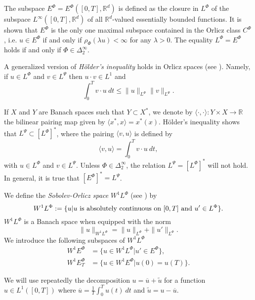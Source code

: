 \documentclass[twoside]{article}
\theoremstyle{remark}
\newcommand{\orlnor}{\|_{L^{\Phi}}}
\newcommand{\lphi}{L^{\Phi}}
\newcommand{\lpsi}{L^{\Psi}}
\newcommand{\ephi}{E^{\Phi}}
\newcommand{\claseor}{C^{\Phi}}
\newcommand{\wphi}{W^{1}\lphi}
\newcommand{\wphie}{W^{1}\ephi}
\newcommand{\rr}{\mathbb{R}}
\renewcommand{\leq}{\leqslant}
\begin{document}
The subspace $\ephi=\ephi([0,T],\rr^d)$ is defined as the closure in $\lphi$ of the subspace $L^{\infty}([0,T],\rr^d)$ of all $\mathbb{R}^d$-valued essentially bounded functions. It is shown that  $\ephi$ is the only one maximal subspace contained in the Orlicz class $\claseor$, i.e.
$u\in\ephi$ if and only if $\rho_{\Phi}(\lambda u)<\infty$ for any $\lambda>0$. The equality $\lphi=\ephi$ holds if and only if $\Phi\in\Delta_2^{\infty}$.

A generalized version of \emph{H\"older's inequality} holds in Orlicz spaces (see \cite[Thm. 9.3]{KR}). Namely, if $u\in\lphi$ and $v\in\lpsi$ then $u\cdot v\in L^1$ and
\begin{equation}\label{holder}
\int_0^Tv\cdot u\ dt\leq \|u\orlnor\|v\|_{L^{\Psi}}.
\end{equation}




If $X$ and $Y$ are  Banach spaces such that  $Y\subset X^*$, we denote by $\langle\cdot,\cdot\rangle:Y\times X\to\mathbb{R}$ the bilinear pairing  map given by $\langle x^*,x\rangle=x^*(x)$. H\"older's inequality shows that $\lpsi\subset \left[\lphi\right]^*$, where the pairing
$\langle v, u\rangle$
is defined by 
\begin{equation}\label{pairing}
  \langle v,u\rangle=\int_0^Tv\cdot u\ dt,
\end{equation}
with  $u\in\lphi$ and $v\in\lpsi$.
 Unless $\Phi \in \Delta_2^{\infty}$, the relation $\lpsi= \left[\lphi\right]^*$ will not hold. In general, it is true  that  $\left[\ephi\right]^*=\lpsi$.



We define the \emph{Sobolev-Orlicz space} $\wphi$ (see \cite{adams_sobolev}) by
\[\wphi:=\{u| u \hbox{ is absolutely continuous on $[0,T]$ and } u'\in \lphi\}.\]
$\wphi$ is a Banach space when equipped with the norm
\begin{equation}\label{def-norma-orlicz-sob}
\|  u  \|_{\wphi}= \|  u  \|_{\lphi} + \|u'\orlnor.
\end{equation}
We introduce the following subspaces of $\wphi$
\begin{equation}\label{def-esp-orlicz-sob-per}
\begin{split}
\wphie&=\{u\in\wphi|u'\in\ephi\},\\
\wphie_T&=\{u\in\wphie|u(0)=u(T)\}.
\end{split}
\end{equation}



We will use repeatedly the decomposition $u=\overline{u}+\widetilde{u}$ for a function $u\in L^1([0,T])$  where $\overline{u} =\frac1T\int_0^T u(t)\ dt$ and $\widetilde{u}=u-\overline{u}$.
\end{document}
